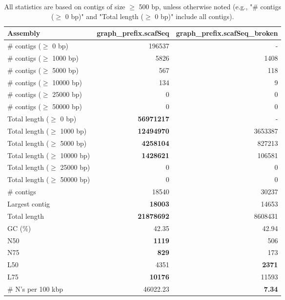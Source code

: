 \documentclass[12pt,a4paper]{article}
\begin{document}
\begin{table}[ht]
\begin{center}
\caption{All statistics are based on contigs of size $\geq$ 500 bp, unless otherwise noted (e.g., "\# contigs ($\geq$ 0 bp)" and "Total length ($\geq$ 0 bp)" include all contigs).}
\begin{tabular}{|l*{2}{|r}|}
\hline
Assembly & graph\_prefix.scafSeq & graph\_prefix.scafSeq\_broken \\ \hline
\# contigs ($\geq$ 0 bp) & 196537 & - \\ \hline
\# contigs ($\geq$ 1000 bp) & 5826 & 1408 \\ \hline
\# contigs ($\geq$ 5000 bp) & 567 & 118 \\ \hline
\# contigs ($\geq$ 10000 bp) & 134 & 9 \\ \hline
\# contigs ($\geq$ 25000 bp) & 0 & 0 \\ \hline
\# contigs ($\geq$ 50000 bp) & 0 & 0 \\ \hline
Total length ($\geq$ 0 bp) & {\bf 56971217} & - \\ \hline
Total length ($\geq$ 1000 bp) & {\bf 12494970} & 3653387 \\ \hline
Total length ($\geq$ 5000 bp) & {\bf 4258104} & 827213 \\ \hline
Total length ($\geq$ 10000 bp) & {\bf 1428621} & 106581 \\ \hline
Total length ($\geq$ 25000 bp) & 0 & 0 \\ \hline
Total length ($\geq$ 50000 bp) & 0 & 0 \\ \hline
\# contigs & 18540 & 30237 \\ \hline
Largest contig & {\bf 18003} & 14653 \\ \hline
Total length & {\bf 21878692} & 8608431 \\ \hline
GC (\%) & 42.35 & 42.94 \\ \hline
N50 & {\bf 1119} & 506 \\ \hline
N75 & {\bf 829} & 173 \\ \hline
L50 & 4351 & {\bf 2371} \\ \hline
L75 & {\bf 10176} & 11593 \\ \hline
\# N's per 100 kbp & 46022.23 & {\bf 7.34} \\ \hline
\end{tabular}
\end{center}
\end{table}
\end{document}
